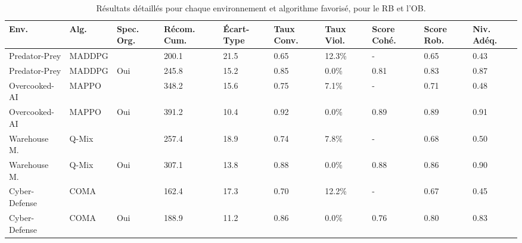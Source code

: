 \documentclass[final]{jfsma}
\begin{document}
\begin{table*}[h!]
  \centering
  \caption{Résultats détaillés pour chaque environnement et algorithme favorisé, pour le RB et l'OB.}
  \label{tab:detailed_results}
  \footnotesize
  \renewcommand{\arraystretch}{1.2}
  \begin{tabular}{p{2.2cm}p{1.6cm}p{.8cm}p{1.3cm}p{1cm}p{1.3cm}p{1.3cm}p{1.2cm}p{}p{0.8cm}}
    \hline
    \textbf{Env.} & \textbf{Alg.} & \textbf{Spec. Org.} & \textbf{Récom. Cum.} & \textbf{Écart-Type} & \textbf{Taux Conv.} & \textbf{Taux Viol.} & \textbf{Score Cohé.} & \textbf{Score Rob.} & \textbf{Niv. Adéq.} \\ \hline
    Predator-Prey & MADDPG        &                     & 200.1                & 21.5                & 0.65                & 12.3\%              & -                    & 0.65                & 0.43                \\
    Predator-Prey & MADDPG        & Oui                 & 245.8                & 15.2                & 0.85                & 0.0\%               & 0.81                 & 0.83                & 0.87                \\
    Overcooked-AI & MAPPO         &                     & 348.2                & 15.6                & 0.75                & 7.1\%               & -                    & 0.71                & 0.48                \\
    Overcooked-AI & MAPPO         & Oui                 & 391.2                & 10.4                & 0.92                & 0.0\%               & 0.89                 & 0.89                & 0.91                \\
    Warehouse M.  & Q-Mix         &                     & 257.4                & 18.9                & 0.74                & 7.8\%               & -                    & 0.68                & 0.50                \\
    Warehouse M.  & Q-Mix         & Oui                 & 307.1                & 13.8                & 0.88                & 0.0\%               & 0.88                 & 0.86                & 0.90                \\
    Cyber-Defense & COMA          &                     & 162.4                & 17.3                & 0.70                & 12.2\%              & -                    & 0.67                & 0.45                \\
    Cyber-Defense & COMA          & Oui                 & 188.9                & 11.2                & 0.86                & 0.0\%               & 0.76                 & 0.80                & 0.83                \\ \hline
  \end{tabular}
\end{table*}
\end{document}
